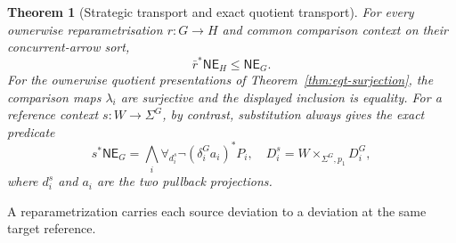 \documentclass[11pt,a4paper]{article}
\numberwithin{equation}{section}
\newtheorem{theorem}{Theorem}[section]
\theoremstyle{definition}
\theoremstyle{remark}
\theoremstyle{plain}
\begin{document}
\begin{theorem}[Strategic transport and exact quotient transport]
\label{thm:fib-strategic-transport}
For every ownerwise reparametrisation $r:G\to H$ and common comparison
context on their concurrent-arrow sort,
\begin{equation}\label{eq:fib-ne-inclusion}
 \bar r^*\mathsf{NE}_H\leq\mathsf{NE}_G.
\end{equation}
For the ownerwise quotient presentations of
Theorem~\ref{thm:egt-surjection}, the comparison maps $\lambda_i$
are surjective and the displayed inclusion is equality.
For a reference context $s:W\to\Sigma^G$, by contrast, substitution
always gives the exact predicate
\begin{equation}\label{eq:fib-ne-reference}
 s^*\mathsf{NE}_G
 =\bigwedge_i\forall_{d_i^s}\neg(\delta_i^Ga_i)^*P_i,
 \quad
 D_i^s=W\times_{\Sigma^G,p_1}D_i^G,
\end{equation}
where $d_i^s$ and $a_i$ are the two pullback projections.
\end{theorem}

\noindent A reparametrization carries each source deviation to a deviation at the same target reference.
\begin{center}
\end{center}
\end{document}

